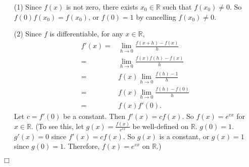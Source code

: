\documentclass{article}
\begin{document}
\begin{enumerate}
\item[(1)]
Since $f(x)$ is not zero, there exists $x_0 \in \mathbb{R}$ such that $f(x_0) \neq 0$.
So $f(0)f(x_0) = f(x_0)$, or $f(0) = 1$ by cancelling $f(x_0) \neq 0$.
\item[(2)]
Since $f$ is differentiable, for any $x \in \mathbb{R}$,
\begin{align*}
f'(x)
=& \lim_{h \rightarrow 0} \frac{f(x + h) - f(x)}{h} \\
=& \lim_{h \rightarrow 0} \frac{f(x)f(h) - f(x)}{h} \\
=& f(x) \lim_{h \rightarrow 0} \frac{f(h) - 1}{h} \\
=& f(x) \lim_{h \rightarrow 0} \frac{f(h) - f(0)}{h} \\
=& f(x) f'(0).
\end{align*}
Let $c = f'(0)$ be a constant. Then $f'(x) = c f(x)$.
So $f(x) = e^{cx}$ for $x \in \mathbb{R}$.
(To see this, let $g(x) = \frac{f(x)}{e^{cx}}$ be well-defined on $\mathbb{R}$. $g(0) = 1$.
$g'(x) = 0$ since $f'(x) = c f(x)$. So $g(x)$ is a constant, or $g(x) = 1$ since $g(0) = 1$.
Therefore, $f(x) = e^{cx}$ on $\mathbb{R}$.)
\end{enumerate}
$\Box$ \\
\end{document}
